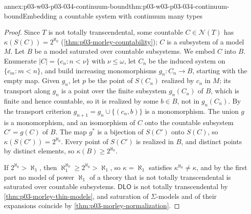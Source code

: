 \begin{annexitem}{annex:p03-w03-p03-034-continuum-bound}{thm:p03-w03-p03-034-continuum-bound}{Embedding a countable system with continuum many types}
\begin{proof}
Since \(T\) is not totally transcendental, some countable
\(C\in\mathcal N(T)\) has \(\kappa(S(C))=2^{\aleph_0}\)
(\cref{thm:p03-morley-countability}); \(C\) is a subsystem of a model
\(M\). Let \(B\) be a model saturated over countable subsystems. We embed
\(C\) into \(B\). Enumerate \(|C|=\{c_n:n<\nu\}\) with \(\nu\leq\omega\),
let \(C_n\) be the induced system on \(\{c_m:m<n\}\), and build
increasing monomorphisms \(g_n:C_n\to B\), starting with the empty map.
Given \(g_n\), let \(p\) be the point of \(S(C_n)\) realized by \(c_n\) in
\(M\); its transport along \(g_n\) is a point over the finite subsystem
\(g_n(C_n)\) of \(B\), which is finite and hence countable, so it is
realized by some \(b\in B\), not in
\(g_n(C_n)\). By the transport criterion \(g_{n+1}=g_n\cup\{(c_n,b)\}\)
is a monomorphism. The union \(g\) is a monomorphism, and an isomorphism
of \(C\) onto the countable subsystem \(C'=g(C)\) of \(B\). The map
\(g^*\) is a bijection of \(S(C')\) onto \(S(C)\), so
\(\kappa(S(C'))=2^{\aleph_0}\). Every point of \(S(C')\) is realized in
\(B\), and distinct points by distinct elements, so
\(\kappa(B)\geq2^{\aleph_0}\).

If \(2^{\aleph_0}>\aleph_1\), then
\(\aleph_1^{\aleph_0}\geq2^{\aleph_0}>\aleph_1\), so \(\kappa=\aleph_1\)
satisfies \(\kappa^{\aleph_0}\neq\kappa\), and by the first part no model
of power \(\aleph_1\) of a theory that is not totally transcendental is
saturated over countable subsystems. \(\mathsf{DLO}\) is not totally
transcendental by \cref{thm:p03-morley-thin-models}, and saturation of
\(\Sigma\)-models and of their expansions coincide by
\cref{thm:p03-morley-normalization}.
\end{proof}
\end{annexitem}
